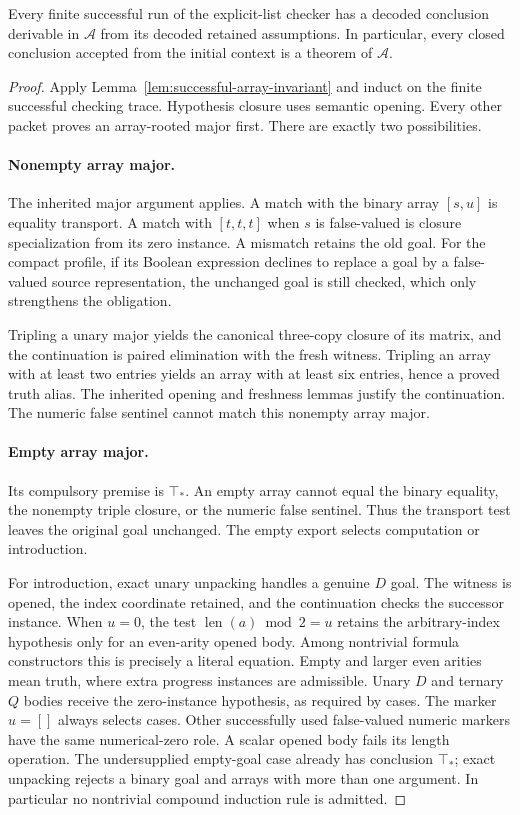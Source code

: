 \begin{theorem}
Every finite successful run of the explicit-list checker has a decoded
conclusion derivable in $\mathcal A$ from its decoded retained
assumptions.  In particular, every closed conclusion accepted from the
initial context is a theorem of $\mathcal A$.
\end{theorem}
\begin{proof}
Apply Lemma~\ref{lem:successful-array-invariant} and induct on the
finite successful checking trace.  Hypothesis closure uses semantic
opening.  Every other packet proves an array-rooted major first.
There are exactly two possibilities.

\paragraph{Nonempty array major.}
The inherited major argument applies.  A match with the binary array
$[s,u]$ is equality transport.  A match with $[t,t,t]$ when $s$ is
false-valued is closure specialization from its zero instance.  A
mismatch retains the old goal. For the compact profile, if its Boolean
expression declines to
replace a goal by a false-valued source representation, the unchanged
goal is still checked, which only strengthens the obligation.

Tripling a unary major yields the canonical three-copy closure of its
matrix, and the continuation is paired elimination with the fresh witness.
Tripling an array with at least two entries yields an array with at least
six entries, hence a proved truth alias.  The inherited opening and
freshness lemmas justify the continuation.  The numeric false sentinel
cannot match this nonempty array major.

\paragraph{Empty array major.}
Its compulsory premise is $\top_*$.  An empty array cannot equal the
binary equality, the nonempty triple closure, or the numeric false
sentinel.  Thus the transport test leaves the original goal unchanged.
The empty export selects computation or introduction.

For introduction, exact unary unpacking handles a genuine $D$ goal.
The witness is opened, the index coordinate retained, and the continuation
checks the successor instance.  When $u=0$, the test
$\operatorname{len}(a)\bmod2=u$ retains the arbitrary-index hypothesis
only for an even-arity opened body.  Among nontrivial formula constructors
this is precisely a literal equation.  Empty and larger even arities mean
truth, where extra progress instances are admissible.  Unary $D$ and
ternary $Q$ bodies receive the zero-instance hypothesis, as required by
cases.  The marker $u=[]$ always selects cases.  Other successfully used
false-valued numeric markers have the same numerical-zero role.  A scalar
opened body fails its length operation.  The undersupplied empty-goal case
already has conclusion $\top_*$; exact unpacking rejects a binary goal
and arrays with more than one argument.  In particular no nontrivial
compound induction rule is admitted.


\end{proof}
